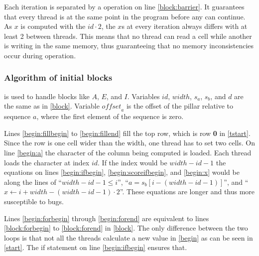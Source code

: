 Each iteration is separated by a  operation on line \ref{block:barrier}.
It guarantees that every thread is at the same point in the program before any can continue.
As $x$ is computed with the $id \cdot 2$, the $x$s at every iteration always differs with at least 2 between threads.
This means that no thread can read a cell while another is writing in the same memory, thus guaranteeing that no memory inconsistencies occur during operation.



\subsubsection{Algorithm of initial blocks}
 is used to handle blocks like $A$, $E$, and $I$.
Variables $id$, $width$, $s_a$, $s_b$, and $d$ are the same as in \cref{block}.
Variable $\mathit{offset}_a$ is the offset of the pillar relative to sequence $a$, where the first element of the sequence is zero.

Lines \ref{begin:fillbegin} to \ref{begin:fillend} fill the top row, which is row \textbf{0} in \cref{tstart}.
Since the row is one cell wider than the width, one thread has to set two cells.
On line \ref{begin:a} the character of the column being computed is loaded.
Each thread loads the character at index $id$.
If the index would be $width - id - 1$ the equations on lines \ref{begin:ifbegin}, \ref{begin:scoreifbegin}, and \ref{begin:x} would be along the lines of ``$width - id - 1 \leq i$'', ``$a = s_b[i-(width-id-1)]$'', and ``$x \gets i + width - (width - id - 1) \cdot 2$''.
These equations are longer and thus more susceptible to bugs.

Lines \ref{begin:forbegin} through \ref{begin:forend} are equivalent to lines \ref{block:forbegin} to \ref{block:forend} in \cref{block}.
The only difference between the two loops is that not all the threads calculate a new value in \cref{begin} as can be seen in \cref{start}.
The if statement on line \ref{begin:ifbegin} ensures that.




